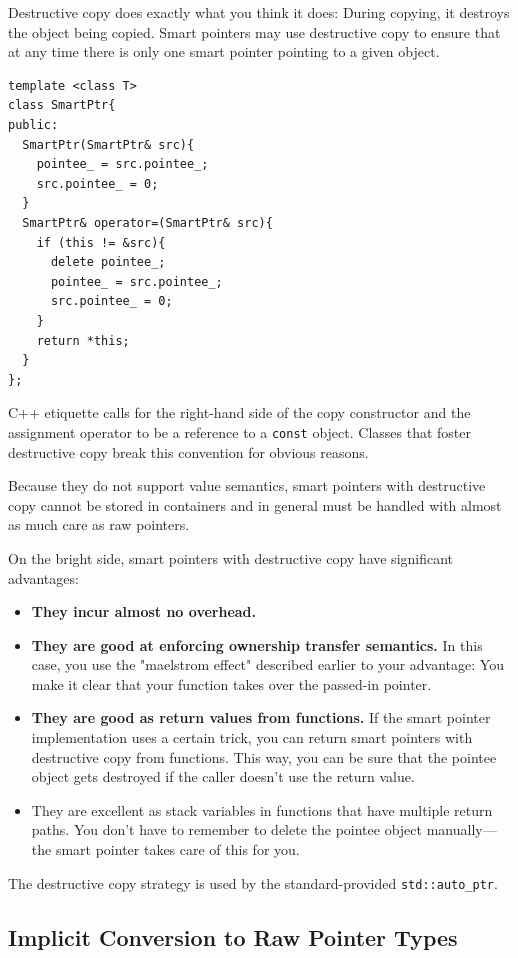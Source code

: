 Destructive copy does exactly what you think it does: During copying,
it destroys the object being copied. Smart pointers may use
destructive copy to ensure that at any time there is only one smart
pointer pointing to a given object.
\begin{verbatim}
template <class T>
class SmartPtr{
public:
  SmartPtr(SmartPtr& src){
    pointee_ = src.pointee_;
    src.pointee_ = 0;
  }
  SmartPtr& operator=(SmartPtr& src){
    if (this != &src){
      delete pointee_;
      pointee_ = src.pointee_;
      src.pointee_ = 0;
    }
    return *this;
  }
};
\end{verbatim}

C++ etiquette calls for the right-hand side of the copy constructor
and the assignment operator to be a reference to a \texttt{const}
object. Classes that foster destructive copy break this convention for
obvious reasons.

Because they do not support value semantics, smart pointers with
destructive copy cannot be stored in containers and in general must be
handled with almost as much care as raw pointers.

On the bright side, smart pointers with destructive copy have
significant advantages:
\begin{itemize}
\item \textbf{They incur almost no overhead. }
\item \textbf{They are good at enforcing ownership transfer
    semantics.} In this 
  case, you use the "maelstrom effect" described earlier to your
  advantage: You make it clear that your function takes over the
  passed-in pointer.
\item \textbf{They are good as return values from functions.} If the smart
  pointer implementation uses a certain trick, you can return smart
  pointers with destructive copy from functions. This way, you can be
  sure that the pointee object gets destroyed if the caller doesn't
  use the return value.
\item They are excellent as stack variables in functions that have
  multiple return paths. You don't have to remember to delete the
  pointee object manually—the smart pointer takes care of this for
  you. 
\end{itemize}
The destructive copy strategy is used by the standard-provided
\texttt{std::auto\_ptr}.

\subsection{Implicit Conversion to Raw Pointer Types}

